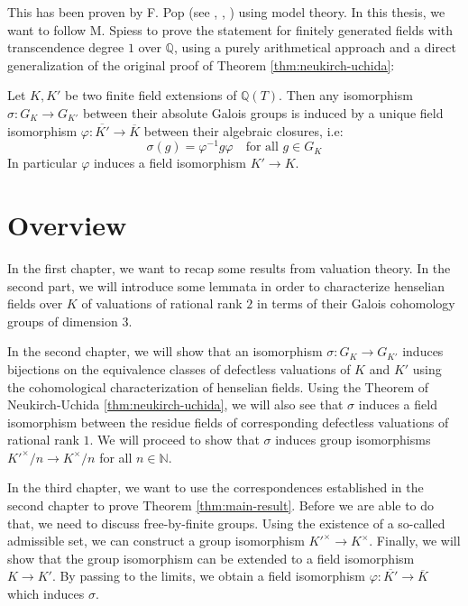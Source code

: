 This has been proven by F. Pop (see \cite{Po90}, \cite{Po94}, \cite{Po95}) using model theory. In this thesis, we want to follow M. Spiess \cite{Sp96} to prove the statement for finitely generated fields with transcendence degree $1$ over $\mathbb{Q}$, using a purely arithmetical approach and a direct generalization of the original proof of Theorem \ref{thm:neukirch-uchida}:

\pagebreak

\begin{theorem}\label{thm:main-result}
Let $K,K'$ be two finite field extensions of $\mathbb{Q}(T)$. Then any isomorphism $\sigma:G_K\to G_{K'}$ between their absolute Galois groups is induced by a unique field isomorphism $\varphi:\overline{K'}\to\overline{K}$ between their algebraic closures, i.e: 
\[\sigma(g) =\varphi^{-1}g\varphi \quad \text{for all }g\in G_K\]
In particular $\varphi$ induces a field isomorphism $K'\to K$.
\end{theorem}

\section{Overview}

In the first chapter, we want to recap some results from valuation theory. In the second part, we will introduce some lemmata in order to characterize henselian fields over $K$ of valuations of rational rank $2$ in terms of their Galois cohomology groups of dimension $3$.

In the second chapter, we will show that an isomorphism $\sigma: G_K\to G_{K'}$ induces bijections on the equivalence classes of defectless valuations of $K$ and $K'$ using the cohomological characterization of henselian fields. Using the Theorem of Neukirch-Uchida \ref{thm:neukirch-uchida}, we will also see that $\sigma$ induces a field isomorphism between the residue fields of corresponding defectless valuations of rational rank $1$. We will proceed to show that $\sigma$ induces group isomorphisms $K'^\times/n\to K^\times/n$ for all $n\in\mathbb{N}$.

In the third chapter, we want to use the correspondences established in the second chapter to prove Theorem \ref{thm:main-result}. Before we are able to do that, we need to discuss free-by-finite groups. Using the existence of a so-called admissible set, we can construct a group isomorphism $K'^\times\to K^\times$. Finally, we will show that the group isomorphism can be extended to a field isomorphism $K\to K'$. By passing to the limits, we obtain a field isomorphism $\varphi: \overline{K'}\to\overline{K}$ which induces $\sigma$.

